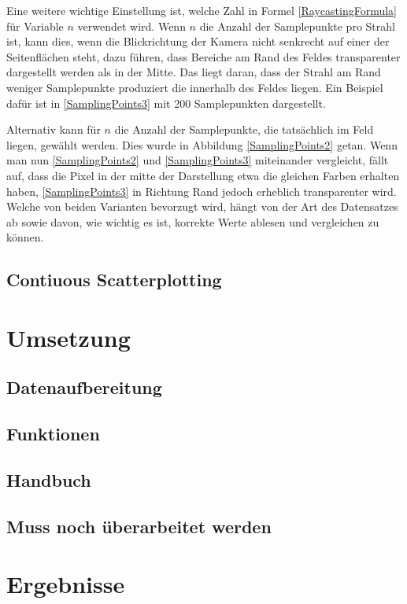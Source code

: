 \documentclass[a4paper,fontsize=12pt,toc=bib,halfparskip]{scrartcl}
\begin{document}
Eine weitere wichtige Einstellung ist, welche Zahl in Formel \ref{RaycastingFormula} f\"ur Variable $n$ verwendet wird. Wenn $n$ die Anzahl der Samplepunkte pro Strahl ist, kann dies, wenn die Blickrichtung der Kamera nicht senkrecht auf einer der Seitenfl\"achen steht, dazu f\"uhren, dass Bereiche am Rand des Feldes transparenter dargestellt werden als in der Mitte. Das liegt daran, dass der Strahl am Rand weniger Samplepunkte produziert die innerhalb des Feldes liegen. Ein Beispiel daf\"ur ist in \ref{SamplingPoints3} mit 200 Samplepunkten dargestellt. 

Alternativ kann f\"ur $n$ die Anzahl der Samplepunkte, die tats\"achlich im Feld liegen, gew\"ahlt werden. Dies wurde in Abbildung \ref{SamplingPoints2} getan. Wenn man nun \ref{SamplingPoints2} und \ref{SamplingPoints3} miteinander vergleicht, f\"allt auf, dass die Pixel in der mitte der Darstellung etwa die gleichen Farben erhalten haben, \ref{SamplingPoints3} in Richtung Rand jedoch erheblich transparenter wird. Welche von beiden Varianten bevorzugt wird, h\"angt von der Art des Datensatzes ab sowie davon, wie wichtig es ist, korrekte Werte ablesen und vergleichen zu k\"onnen.

\subsection{Contiuous Scatterplotting}

\section{Umsetzung}
\label{sec:Umsetzung}
\subsection{Datenaufbereitung}
\subsection{Funktionen}
\subsection{Handbuch}
\subsection{Muss noch \"uberarbeitet werden}
\section{Ergebnisse}
\label{Ergebnisse}
\end{document}
